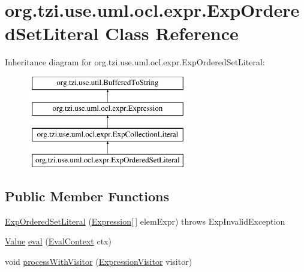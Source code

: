 \hypertarget{classorg_1_1tzi_1_1use_1_1uml_1_1ocl_1_1expr_1_1_exp_ordered_set_literal}{\section{org.\-tzi.\-use.\-uml.\-ocl.\-expr.\-Exp\-Ordered\-Set\-Literal Class Reference}
\label{classorg_1_1tzi_1_1use_1_1uml_1_1ocl_1_1expr_1_1_exp_ordered_set_literal}
}
Inheritance diagram for org.\-tzi.\-use.\-uml.\-ocl.\-expr.\-Exp\-Ordered\-Set\-Literal\-:\begin{figure}[H]
\begin{center}
\leavevmode
\includegraphics[height=4.000000cm]{classorg_1_1tzi_1_1use_1_1uml_1_1ocl_1_1expr_1_1_exp_ordered_set_literal}
\end{center}
\end{figure}
\subsection*{Public Member Functions}
\begin{DoxyCompactItemize}
\item 
\hyperlink{classorg_1_1tzi_1_1use_1_1uml_1_1ocl_1_1expr_1_1_exp_ordered_set_literal_a6577d3dade67e911d1a0666b0fa9d48b}{Exp\-Ordered\-Set\-Literal} (\hyperlink{classorg_1_1tzi_1_1use_1_1uml_1_1ocl_1_1expr_1_1_expression}{Expression}\mbox{[}$\,$\mbox{]} elem\-Expr)  throws Exp\-Invalid\-Exception     
\item 
\hyperlink{classorg_1_1tzi_1_1use_1_1uml_1_1ocl_1_1value_1_1_value}{Value} \hyperlink{classorg_1_1tzi_1_1use_1_1uml_1_1ocl_1_1expr_1_1_exp_ordered_set_literal_a767477defade67c5cb0bac96dbfef51f}{eval} (\hyperlink{classorg_1_1tzi_1_1use_1_1uml_1_1ocl_1_1expr_1_1_eval_context}{Eval\-Context} ctx)
\item 
void \hyperlink{classorg_1_1tzi_1_1use_1_1uml_1_1ocl_1_1expr_1_1_exp_ordered_set_literal_af68bdb422831e5d6e69c8b324b60f8c5}{process\-With\-Visitor} (\hyperlink{interfaceorg_1_1tzi_1_1use_1_1uml_1_1ocl_1_1expr_1_1_expression_visitor}{Expression\-Visitor} visitor)
\end{DoxyCompactItemize}
